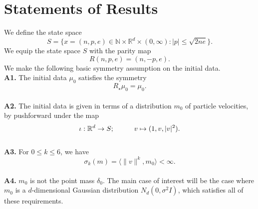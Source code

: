\section{Statements of Results}
We define the state space \begin{equation*}
    S=\{x=(n, p, e) \in \mathbb{N}\times \mathbb{R}^d\times (0,\infty): |p|\leq \sqrt{2ne} \}.
\end{equation*} We equip the state space $S$ with the parity map \begin{equation*}
    R(n,p,e)=(n,-p,e).
\end{equation*} We make the following basic symmetry assumption on the initial data.
\\\textbf{A1.} The initial data $\mu_0$ satisfies the symmetry \begin{equation}
    R_\star \mu_0 = \mu_0.
\end{equation}
\\ \textbf{A2.} The initial data is given in terms of a distribution $m_0$ of particle velocities, by pushforward under the map
\begin{equation}
    \iota: \mathbb{R}^d \rightarrow S; \hspace{1cm} v\mapsto (1, v, |v|^2).
\end{equation}
\\ \textbf{A3.} For $0\leq k\leq 6$, we have
\begin{equation}
    \sigma_k(m)=\langle \|v\|^k, m_0\rangle <\infty.
\end{equation}
\\ \textbf{A4.} $m_0$ is not the point mass $\delta_0$.
The main case of interest will be the case where $m_0$ is a $d$-dimensional Gaussian distribution $N_d(0, \sigma^2I)$, which satisfies all of these requirements.

